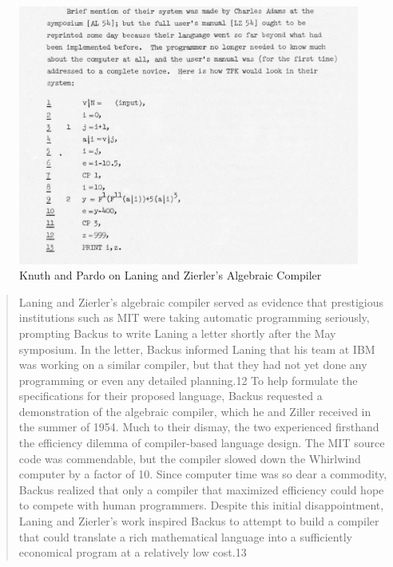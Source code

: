 \begin{figure}[h!]
	\centering
	\includegraphics[width=0.5\linewidth]{resource/knuth_pardo_on_laning_zierlers_algebraic_compiler.png}
	\caption{Knuth and Pardo on Laning and Zierler's Algebraic Compiler}
	\label{fig:knuth-pardo-on-laning-zierler}
\end{figure}

\begin{quotation}
	Laning and Zierler's algebraic compiler served as evidence that prestigious
	institutions such as MIT were taking automatic programming
	seriously, prompting
	Backus to write Laning a letter shortly after the May symposium.
	In the letter,
	Backus informed Laning that his team at IBM was working on a
	similar compiler,
	but that they had not yet done any programming or even any
	detailed planning.12
	To help formulate the specifications for their proposed language, Backus
	requested a demonstration of the algebraic compiler, which he and Ziller
	received in the summer of 1954. Much to their dismay, the two
	experienced firsthand the efficiency dilemma of compiler-based
	language design. The MIT
	source code was commendable, but the compiler slowed down the Whirlwind
	computer by a factor of 10. Since computer time was so dear a
	commodity, Backus
	realized that only a compiler that maximized efficiency could
	hope to compete
	with human programmers. Despite this initial disappointment, Laning and
	Zierler's work inspired Backus to attempt to build a compiler that could
	translate a rich mathematical language into a sufficiently
	economical program
	at a relatively low cost.13
	\cite{grace_hopper_and_the_invention_of_the_information_age_2009}
\end{quotation}

